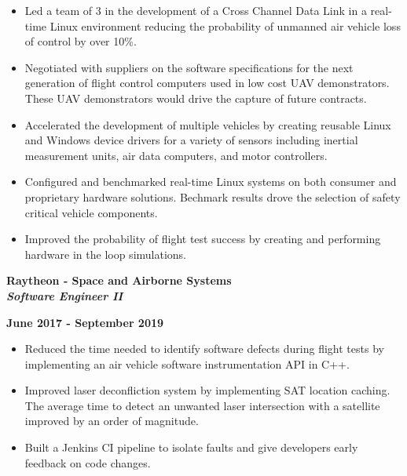 \documentclass[11pt,letterpaper]{article}
\begin{document}
\begin{itemize}[noitemsep,topsep=0pt]
	\setlength\itemsep{0.2em}
	\item Led a team of 3 in the development of a Cross Channel Data Link in
	      a real-time Linux environment reducing the probability of unmanned
	      air vehicle loss of control by over 10\%.
	\item Negotiated with suppliers on the software specifications for the next
	      generation of flight control computers used in low cost UAV
	      demonstrators. These UAV demonstrators would drive the capture of
	      future contracts.
	\item Accelerated the development of multiple vehicles by creating
	      reusable Linux and Windows device drivers for a variety of sensors
	      including inertial measurement units, air data computers, and motor
	      controllers.
	\item Configured and benchmarked real-time Linux systems on both consumer
	      and proprietary hardware solutions. Bechmark results drove the
	      selection of safety critical vehicle components.
	\item Improved the probability of flight test success by creating and
	      performing hardware in the loop simulations.
\end{itemize}

\medskip

\begin{minipage}[t]{0.53\textwidth}
	\begin{flushleft}
		\textbf{Raytheon - Space and Airborne Systems}\\
		\textbf{\textit{Software Engineer II}}\\
	\end{flushleft}
\end{minipage}
\begin{minipage}[t]{0.43\textwidth}
	\begin{flushright}
		\textbf{June 2017 - September 2019}
	\end{flushright}
\end{minipage}

\begin{itemize}[noitemsep,topsep=0pt]
	\setlength\itemsep{0.2em}
	\item Reduced the time needed to identify software defects during flight
	      tests by implementing an air vehicle software instrumentation API in
	      C++.
	\item Improved laser deconfliction system by implementing SAT location
	      caching. The average time to detect an unwanted laser intersection
	      with a satellite improved by an order of magnitude.
	\item Built a Jenkins CI pipeline to isolate faults and give developers
	      early feedback on code changes.
\end{itemize}
\end{document}
